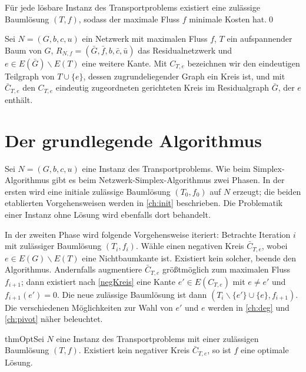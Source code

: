\begin{kor}\label{TP}Für jede lösbare Instanz des Transportproblems existiert eine zulässige Baumlösung $(T,f)$, sodass der maximale Fluss $f$ minimale Kosten hat.\qed\end{kor}

\begin{nota}Sei $N=(G,b,c,u)$ ein Netzwerk mit maximalen Fluss $f$, $T$ ein aufspannender Baum von $G$, $R_{N,f}=(\bar{G},\bar{f},b,\bar{c},\bar{u})$ das Residualnetzwerk und $e\in E(\bar{G})\backslash E(T)$ eine weitere Kante. Mit $C_{T,e}$ bezeichnen wir den eindeutigen Teilgraph von $T\cup\{e\}$, dessen zugrundeliegender Graph ein Kreis ist, und mit $\bar{C}_{T,e}$ den $C_{T,e}$ eindeutig zugeordneten gerichteten Kreis im Residualgraph $\bar{G}$, der $e$ enthält.\end{nota}

\section{Der grundlegende Algorithmus}\label{ch:alg}

Sei $N=(G,b,c,u)$ eine Instanz des Transportproblems. Wie beim Simplex-Algorithmus gibt es beim Netzwerk-Simplex-Algorithmus zwei Phasen. In der ersten wird eine initiale zulässige Baumlösung $(T_0,f_0)$ auf $N$ erzeugt; die beiden etablierten Vorgehensweisen werden in \cref{ch:init} beschrieben. Die Problematik einer Instanz ohne Lösung wird ebenfalls dort behandelt.

In der zweiten Phase wird folgende Vorgehensweise iteriert: Betrachte Iteration $i$ mit zulässiger Baumlösung $(T_i,f_i)$. Wähle einen negativen Kreis $\bar{C}_{T,e}$, wobei $e\in E(G)\backslash E(T)$ eine Nichtbaumkante ist. Existiert kein solcher, beende den Algorithmus. Andernfalls augmentiere $\bar{C}_{T,e}$ größtmöglich zum maximalen Fluss $f_{i+1}$; dann existiert nach \cref{negKreis} eine Kante $e'\in E(C_{T,e})$ mit $e\neq e'$ und $f_{i+1}(e')=0$. Die neue zulässige Baumlösung ist dann $(T_i\backslash\{e'\}\cup\{e\},f_{i+1})$. Die verschiedenen Möglichkeiten zur Wahl von $e'$ und $e$ werden in \cref{ch:deg} und \cref{ch:pivot} näher beleuchtet.

\begin{restatable}{thm}{Opt}\label{opt}Sei $N$ eine Instanz des Transportproblems mit einer zulässigen Baumlösung $(T,f)$. Existiert kein negativer Kreis $\bar{C}_{T,e}$, so ist $f$ eine optimale Lösung.\end{restatable}

